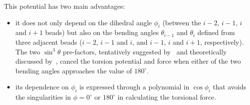 This potential has two main advantages:
\begin{itemize}
\item
it does not only depend on the dihedral angle $\phi_i$ (between the $i-2$, $i-1$, $i$ and $i+1$ beads)
but also on the bending angles $\theta_{i-1}$ and $\theta_i$ defined from three adjacent beads
($i-2$, $i-1$ and $i$, and $i-1$, $i$ and $i+1$, respectively).
The two $\sin^3\theta$ pre-factors, tentatively suggested by~\cite{ScottScheragator1966} and theoretically
discussed by~\cite{PaulingBond}, cancel the torsion potential and force when either of the two bending angles
approaches the value of $180^\circ$.
\item
its dependence on $\phi_i$ is expressed through a polynomial in $\cos\phi_i$ that avoids the singularities in
$\phi=0^\circ$ or $180^\circ$ in calculating the torsional force.
\end{itemize}

